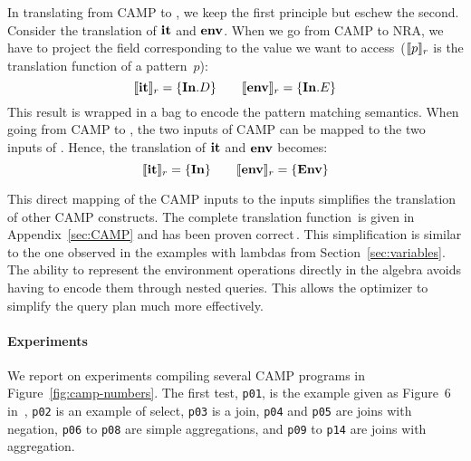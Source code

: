 In translating from CAMP to \NRAEnv, we keep the first principle but
eschew the second. Consider the
translation of $\textup{\textbf{{it}}}$ and $\textup{\textbf{{env}}}$. When we go from CAMP to NRA, we
have to project the field corresponding to the value we want to
access~($\llbracket{p}\rrbracket_r$ is the translation function of a pattern~$p$):
$$
\llbracket{\textup{\textbf{{it}}}}\rrbracket_r = \{\textup{\textbf{{In}}}.D\} \qquad \llbracket{\textup{\textbf{{env}}}}\rrbracket_r = \{\textup{\textbf{{In}}}.E\}
$$
%
This result is wrapped in a bag
to encode the pattern matching semantics.
%
When going from CAMP to \NRAEnv, the two inputs of CAMP can be mapped
to the two inputs of \NRAEnv. Hence, the translation of $\textup{\textbf{{it}}}$ and
$\textup{\textbf{{env}}}$ becomes:
$$
\llbracket{\textup{\textbf{{it}}}}\rrbracket_r = \{\textup{\textbf{{In}}}\} \qquad \llbracket{\textup{\textbf{{env}}}}\rrbracket_r = \{\textup{\textbf{{Env}}}\}
$$

This direct mapping of the CAMP inputs to the \NRAEnv inputs
simplifies the translation of other CAMP constructs.
%
The complete translation
function\, is given
in Appendix~\ref{sec:CAMP} and has been proven
correct\,. This
simplification is similar to the one observed in the examples with
lambdas from Section~\ref{sec:variables}. The ability to represent the
environment operations directly in the algebra avoids having to encode
them through nested queries. This allows the optimizer to simplify
the query plan much more effectively.

\paragraph*{Experiments}

We report on experiments compiling several CAMP programs in
Figure~\ref{fig:camp-numbers}. The first test, \texttt{p01}, is the
example given as Figure~6 in~\cite{ShinnarSH15}, \texttt{p02} is an
example of select, \texttt{p03} is a join, \texttt{p04} and
\texttt{p05} are joins with negation, \texttt{p06} to \texttt{p08} are
simple aggregations, and \texttt{p09} to \texttt{p14} are joins with
aggregation.


